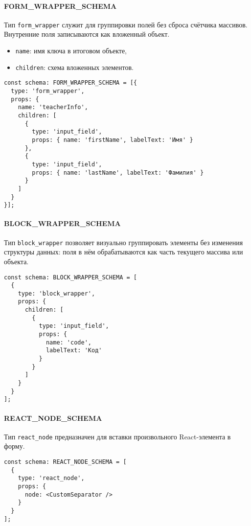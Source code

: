 \paragraph{FORM\_WRAPPER\_SCHEMA}
Тип \texttt{form\_wrapper} служит для группировки полей без сброса счётчика массивов. Внутренние поля записываются как вложенный объект.
\begin{itemize}
  \item \texttt{name}: имя ключа в итоговом объекте,
  \item \texttt{children}: схема вложенных элементов.
\end{itemize}

\begin{lstlisting}[caption={Пример FORM\_WRAPPER\_SCHEMA}]
const schema: FORM_WRAPPER_SCHEMA = [{
  type: 'form_wrapper',
  props: {
    name: 'teacherInfo',
    children: [
      {
        type: 'input_field',
        props: { name: 'firstName', labelText: 'Имя' }
      },
      {
        type: 'input_field',
        props: { name: 'lastName', labelText: 'Фамилия' }
      }
    ]
  }
}];
\end{lstlisting}

\paragraph{BLOCK\_WRAPPER\_SCHEMA}
Тип \texttt{block\_wrapper} позволяет визуально группировать элементы без изменения структуры данных: поля в нём обрабатываются как часть текущего массива или объекта.

\begin{lstlisting}[caption={Пример BLOCK\_WRAPPER\_SCHEMA}]
const schema: BLOCK_WRAPPER_SCHEMA = [
  {
    type: 'block_wrapper',
    props: {
      children: [
        {
          type: 'input_field',
          props: {
            name: 'code',
            labelText: 'Код'
          }
        }
      ]
    }
  }
];
\end{lstlisting}

\paragraph{REACT\_NODE\_SCHEMA}
Тип \texttt{react\_node} предназначен для вставки произвольного React-элемента в форму.

\begin{lstlisting}[caption={Пример REACT\_NODE\_SCHEMA}]
const schema: REACT_NODE_SCHEMA = [
  {
    type: 'react_node',
    props: {
      node: <CustomSeparator />
    }
  }
];
\end{lstlisting}

